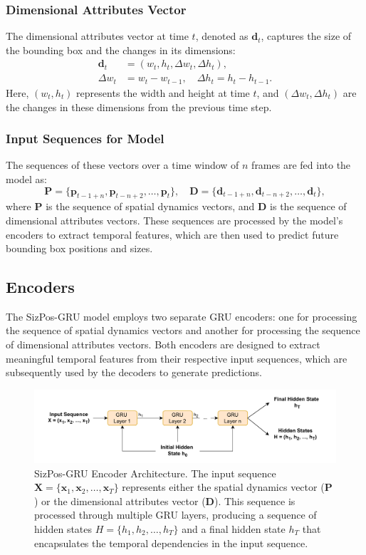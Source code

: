 \documentclass[12pt,oneside]{book} %
\begin{document}
\subsubsection*{Dimensional Attributes Vector}
\noindent The dimensional attributes vector at time $t$, denoted as $\mathbf{d}_t$, captures the size of the bounding box and the changes in its dimensions:
\begin{align}
    \mathbf{d}_t & = \left(w_t, h_t, \Delta w_t, \Delta h_t\right),    \\
    \Delta w_t   & = w_t - w_{t-1}, \quad \Delta h_t = h_t - h_{t-1}.
\end{align}
Here, $(w_t, h_t)$ represents the width and height at time $t$, and $(\Delta w_t, \Delta h_t)$ are the changes in these dimensions from the previous time step.

\subsubsection*{Input Sequences for Model}
\noindent The sequences of these vectors over a time window of \(n\) frames are fed into the model as:
\[
    \mathbf{P} = \{\mathbf{p}_{t-1+n}, \mathbf{p}_{t-n+2}, \dots, \mathbf{p}_t\}, \quad \mathbf{D} = \{\mathbf{d}_{t-1+n}, \mathbf{d}_{t-n+2}, \dots, \mathbf{d}_t\},
\]
where $\mathbf{P}$ is the sequence of spatial dynamics vectors, and
$\mathbf{D}$ is the sequence of dimensional attributes vectors. These sequences
are processed by the model's encoders to extract temporal features, which are
then used to predict future bounding box positions and sizes.

\subsection{Encoders}
\noindent The SizPos-GRU model employs two separate GRU encoders: one for processing the
sequence of spatial dynamics vectors and another for processing the sequence of
dimensional attributes vectors. Both encoders are designed to extract
meaningful temporal features from their respective input sequences, which are
subsequently used by the decoders to generate predictions.

\begin{figure}[H]
    \centering
    \includegraphics[width=1\textwidth]{figures/GRUSizPosEncoder.drawio.pdf}
    \caption{SizPos-GRU Encoder Architecture. The input sequence \( \mathbf{X} = \{\mathbf{x}_1, \mathbf{x}_2, \dots, \mathbf{x}_T\} \) represents either the spatial dynamics vector (\(\mathbf{P}\)) or the dimensional attributes vector (\(\mathbf{D}\)). This sequence is processed through multiple GRU layers, producing a sequence of hidden states \( H = \{h_1, h_2, \dots, h_T\} \) and a final hidden state \( h_T \) that encapsulates the temporal dependencies in the input sequence.}
    \label{fig:sizpos-gru-encoder}
\end{figure}
\end{document}
